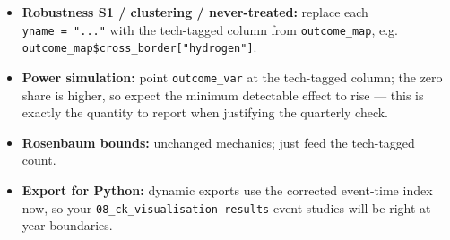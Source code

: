 \documentclass[
]{article}
\providecommand{\tightlist}{%
  \setlength{\itemsep}{0pt}\setlength{\parskip}{0pt}}
\begin{document}
\begin{itemize}
\tightlist
\item
  \textbf{Robustness S1 / clustering / never-treated:} replace each
  \texttt{yname\ =\ "..."} with the tech-tagged column from
  \texttt{outcome\_map}, e.g.
  \texttt{outcome\_map\$cross\_border{[}"hydrogen"{]}}.
\item
  \textbf{Power simulation:} point \texttt{outcome\_var} at the
  tech-tagged column; the zero share is higher, so expect the minimum
  detectable effect to rise --- this is exactly the quantity to report
  when justifying the quarterly check.
\item
  \textbf{Rosenbaum bounds:} unchanged mechanics; just feed the
  tech-tagged count.
\item
  \textbf{Export for Python:} dynamic exports use the corrected
  event-time index now, so your \texttt{08\_ck\_visualisation-results}
  event studies will be right at year boundaries.
\end{itemize}
\end{document}
